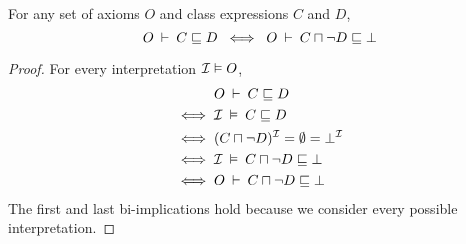 \documentclass[paper.tex]{subfiles}
\begin{document}
\begin{lemma}
  \label{lem:subclassEntailsUnsat}
  For any set of axioms $O$ and class expressions $C$ and $D$,
  \[ O \:\vdash\: C \sqsubseteq D \;\iff\; O \:\vdash\: C \sqcap \neg D \sqsubseteq \bot \]
\end{lemma}
\begin{proof}
  For every interpretation $\mathcal{I} \vDash O$,
  \begin{align*}
    & O \:\vdash\: C \sqsubseteq D \\
    \iff{}& \mathcal{I} \:\vDash\: C \sqsubseteq D \\
    \iff{}& (C \sqcap \neg D)^{\mathcal{I}} = \emptyset = \bot^{\mathcal{I}} \\
    \iff{}& \mathcal{I} \:\vDash\: C \sqcap \neg D \sqsubseteq \bot \\
    \iff{}& O \:\vdash\: C \sqcap \neg D \sqsubseteq \bot
  \end{align*}
  The first and last bi-implications hold because we consider every possible interpretation.
\end{proof}

\end{document}
